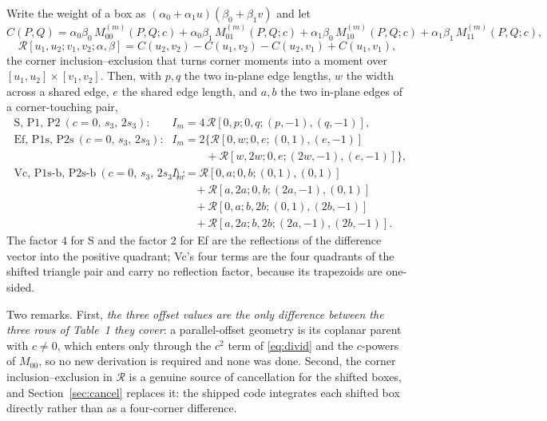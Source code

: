 \documentclass[11pt]{article}
\theoremstyle{remark}
\begin{document}
Write the weight of a box as $(\alpha_0 + \alpha_1 u)(\beta_0 + \beta_1 v)$ and let
\begin{equation}
C(P,Q) = \alpha_0\beta_0\,M_{00}^{(m)}(P,Q;c) + \alpha_0\beta_1\,M_{01}^{(m)}(P,Q;c)
       + \alpha_1\beta_0\,M_{10}^{(m)}(P,Q;c) + \alpha_1\beta_1\,M_{11}^{(m)}(P,Q;c),
\end{equation}
\begin{equation}
\mathcal{R}[u_1,u_2;v_1,v_2;\alpha,\beta] = C(u_2,v_2) - C(u_1,v_2) - C(u_2,v_1) + C(u_1,v_1),
\end{equation}
the corner inclusion--exclusion that turns corner moments into a moment over
$[u_1,u_2]\times[v_1,v_2]$. Then, with $p, q$ the two in-plane edge lengths, $w$ the width
across a shared edge, $e$ the shared edge length, and $a, b$ the two in-plane edges of a
corner-touching pair,
\begin{equation}
\boxed{\;
\begin{aligned}
\text{S, P1, P2}\ (c = 0,\,s_3,\,2s_3):\quad & I_m = 4\,\mathcal{R}[0,p;0,q;(p,-1),(q,-1)],\\[2pt]
\text{Ef, P1s, P2s}\ (c = 0,\,s_3,\,2s_3):\quad & I_m = 2\bigl\{\mathcal{R}[0,w;0,e;(0,1),(e,-1)]\\
 &\qquad\quad + \mathcal{R}[w,2w;0,e;(2w,-1),(e,-1)]\bigr\},\\[2pt]
\text{Vc, P1s-b, P2s-b}\ (c = 0,\,s_3,\,2s_3):\quad & I_m = \mathcal{R}[0,a;0,b;(0,1),(0,1)]\\
 &\qquad + \mathcal{R}[a,2a;0,b;(2a,-1),(0,1)]\\
 &\qquad + \mathcal{R}[0,a;b,2b;(0,1),(2b,-1)]\\
 &\qquad + \mathcal{R}[a,2a;b,2b;(2a,-1),(2b,-1)].
\end{aligned}\;}
\label{eq:copasm}
\end{equation}
The factor $4$ for S and the factor $2$ for Ef are the reflections of the difference
vector into the positive quadrant; Vc's four terms are the four quadrants of the shifted
triangle pair and carry no reflection factor, because its trapezoids are one-sided.

Two remarks. First, \emph{the three offset values are the only difference between the
three rows of Table~1 they cover}: a parallel-offset geometry is its coplanar parent with
$c\neq 0$, which enters only through the $c^2$ term of \eqref{eq:divid} and the $c$-powers
of $M_{00}$, so no new derivation is required and none was done. Second, the corner
inclusion--exclusion in $\mathcal{R}$ is a genuine source of cancellation for the shifted
boxes, and Section~\ref{sec:cancel} replaces it: the shipped code integrates each shifted
box directly rather than as a four-corner difference.
\end{document}
